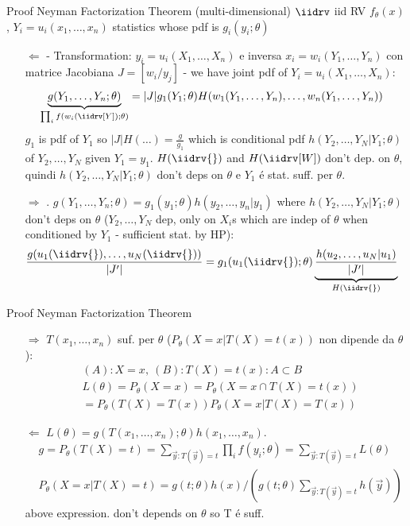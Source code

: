 \documentclass[asd-beamer.tex]{subfiles}%
\begin{document}
\begin{frame}{Proof Neyman Factorization Theorem (multi-dimensional)}
	$\iidrv$ iid RV $f_{\theta}(x)$, $Y_i=u_i(x_1,\ldots,x_n)$ statistics whose pdf is $g_i(y_i;\theta)$
\begin{itemize}
	\item[$\Leftarrow$]  -
	Transformation: $y_i=u_i(X_1,\ldots,X_n)$ e inversa $x_i=w_i(Y_1,\ldots,Y_n)$ con matrice Jacobiana $J=[w_i/y_j]$ - we have joint pdf of $Y_i=u_i(X_1,\ldots,X_n)$:
	\begin{align*}
	&\underbrace{g(Y_1,\ldots,Y_n;\theta)}_{\prod_if(w_i(\iidrv[Y]);\theta)}=|J|g_1(Y_1;\theta)H(w_1(Y_1,\ldots,Y_n),\ldots,w_n(Y_1,\ldots,Y_n))
	\end{align*}
	$g_1$ is pdf of $Y_1$ so $|J|H(\ldots)=\frac{g}{g_1}$ which is conditional pdf $h(Y_2,\ldots,Y_N|Y_1;\theta)$ of $Y_2,\ldots,Y_N$ given $Y_1=y_1$. $H(\iidrv{})$ and $H(\iidrv[W])$ don't dep. on $\theta$, quindi $h(Y_2,\ldots,Y_N|Y_1;\theta)$ don't deps on $\theta$ e $Y_1$ \'e stat. suff. per $\theta$.
	\item[$\Rightarrow$] . $g(Y_1,\ldots,Y_n;\theta)=g_1(y_1;\theta)h(y_2,\ldots,y_n|y_1)$ where $h(Y_2,\ldots,Y_N|Y_1;\theta)$ don't deps on $\theta$ ($Y_2,\ldots,Y_N$ dep, only on $X_i$s which are indep of $\theta$ when conditioned by $Y_1$ - sufficient stat. by HP):
	\begin{align*}
	&\frac{g(u_1(\iidrv{}),\ldots,u_N(\iidrv{}))}{|J'|}=g_1(u_1(\iidrv{});\theta)\underbrace{\frac{h(u_2,\ldots,u_N|u_1)}{|J'|}}_{H(\iidrv{})}
	\end{align*}
\end{itemize}
\end{frame}

\begin{frame}{Proof Neyman Factorization Theorem}
\begin{itemize}
\item[$\Rightarrow$] $T(x_1,\ldots,x_n)$ suf. per $\theta$ ($P_{\theta}(X=x|T(X)=t(x))$ non dipende da $\theta$):
\begin{align*}
&(A): X=x,\ (B): T(X)=t(x): A\subset B\\
&L(\theta)=P_{\theta}(X=x)=P_{\theta}(X=x\cap T(X)=t(x))\\
&=P_{\theta}(T(X)=T(x))P_{\theta}(X=x|T(X)=T(x))
\end{align*}
\item[$\Leftarrow$] $L(\theta)=g(T(x_1,\ldots,x_n);\theta)h(x_1,\ldots,x_n)$.
\begin{align*}
&g=P_{\theta}(T(X)=t)=\sum_{\vec{y}:T(\vec{y})=t}\prod_if(y_i;\theta)=\sum_{\vec{y}:T(\vec{y})=t}L(\theta)\\
&P_{\theta}(X=x|T(X)=t)=g(t;\theta)h(x)/(g(t;\theta)\sum_{\vec{y}:T(\vec{y})=t}h(\vec{y}))
\end{align*}
above expression. don't depends on $\theta$ so T \'e suff.
\end{itemize}
\end{frame}
\end{document}
